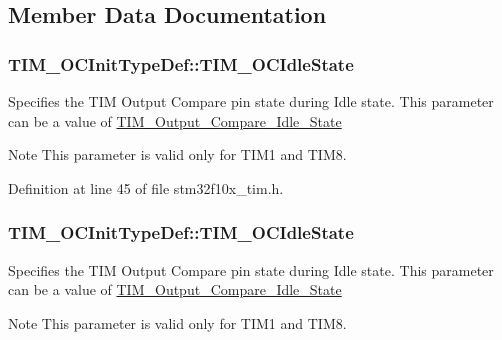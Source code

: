 \subsection{Member Data Documentation}
\subsubsection[{\texorpdfstring{T\+I\+M\+\_\+\+O\+C\+Idle\+State}{TIM_OCIdleState}}]{ T\+I\+M\+\_\+\+O\+C\+Init\+Type\+Def\+::\+T\+I\+M\+\_\+\+O\+C\+Idle\+State}\hypertarget{struct_t_i_m___o_c_init_type_def_a7a6994a1470c512ce6302a1f32f04f4a}{}\label{struct_t_i_m___o_c_init_type_def_a7a6994a1470c512ce6302a1f32f04f4a}
Specifies the T\+IM Output Compare pin state during Idle state. This parameter can be a value of \hyperlink{group___t_i_m___output___compare___idle___state}{T\+I\+M\+\_\+\+Output\+\_\+\+Compare\+\_\+\+Idle\+\_\+\+State} \begin{DoxyNote}{Note}
This parameter is valid only for T\+I\+M1 and T\+I\+M8. 
\end{DoxyNote}


Definition at line 45 of file stm32f10x\+\_\+tim.\+h.

\subsubsection[{\texorpdfstring{T\+I\+M\+\_\+\+O\+C\+Idle\+State}{TIM_OCIdleState}}]{ T\+I\+M\+\_\+\+O\+C\+Init\+Type\+Def\+::\+T\+I\+M\+\_\+\+O\+C\+Idle\+State}\hypertarget{struct_t_i_m___o_c_init_type_def_a2a28f2d62339e06caef12816e04a8f55}{}\label{struct_t_i_m___o_c_init_type_def_a2a28f2d62339e06caef12816e04a8f55}
Specifies the T\+IM Output Compare pin state during Idle state. This parameter can be a value of \hyperlink{group___t_i_m___output___compare___idle___state}{T\+I\+M\+\_\+\+Output\+\_\+\+Compare\+\_\+\+Idle\+\_\+\+State} \begin{DoxyNote}{Note}
This parameter is valid only for T\+I\+M1 and T\+I\+M8. 
\end{DoxyNote}


